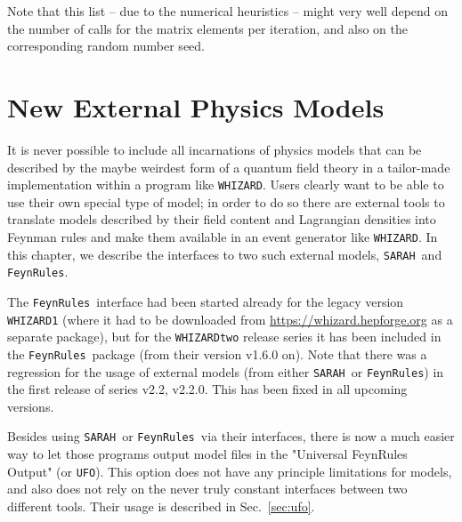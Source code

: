 \documentclass[12pt]{book}
\newcommand{\ttt}[1]{\texttt{#1}}
\newcommand{\whizard}{\ttt{WHIZARD}}
\newcommand{\sarah}{\ttt{SARAH}}
\newcommand{\FeynRules}{\ttt{FeynRules}}
\newcommand{\UFO}{\ttt{UFO}}
\begin{document}
Note that this list -- due to the numerical heuristics -- might very
well depend on the number of calls for the matrix elements per
iteration, and also on the corresponding random number seed.


\chapter{New External Physics Models}
\label{chap:extmodels}

It is never possible to include all incarnations of physics models that
can be described by the maybe weirdest form of a quantum field theory
in a tailor-made implementation within a program like \whizard. Users
clearly want to be able to use their own special type of model; in
order to do so there are external tools to translate models described
by their field content and Lagrangian densities into Feynman rules and
make them available in an event generator like \whizard. In this
chapter, we describe the interfaces to two such external models,
\sarah\ and \FeynRules.

The \FeynRules\ interface had been started already for the legacy
version \whizard\ttt{1} (where it had to be downloaded from
\url{https://whizard.hepforge.org} as a separate package), but
for the \whizard\ttt{two} release series it has been included in the
\FeynRules\ package (from their version v1.6.0 on). Note that there
was a regression for the usage of external models (from either \sarah\
or \FeynRules) in the first release of series v2.2, v2.2.0. This has
been fixed in all upcoming versions.

Besides using \sarah\ or \FeynRules\ via their interfaces, there is
now a much easier way to let those programs output model files in the
"Universal FeynRules Output" (or \UFO). This option does not have any
principle limitations for models, and also does not rely on the never
truly constant interfaces between two different tools. Their usage is
described in Sec.~\ref{sec:ufo}.

\end{document}
